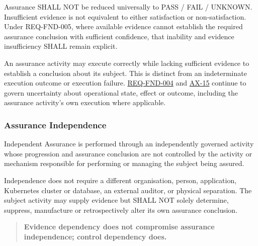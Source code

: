 Assurance SHALL NOT be reduced universally to PASS /\allowbreak{} FAIL /\allowbreak{} UNKNOWN. Insufficient evidence is not equivalent to either satisfaction or non-satisfaction. Under REQ-FND-005, where available evidence cannot establish the required assurance conclusion with sufficient confidence, that inability and evidence insufficiency SHALL remain explicit.

\label{rad:enabling:751}

An assurance activity may execute correctly while lacking sufficient evidence to establish a conclusion about its subject. This is distinct from an indeterminate execution outcome or execution failure. \href{https://github.com/fhirfactory/harmonia/blob/98410db60155198a75f74c79d98060070209faa1/docs/markdown/01-motivation/requirements-constraints/foundational-requirements.md\#req-fnd-004-explicit-indeterminate-outcome}{REQ-FND-004} and \href{https://github.com/fhirfactory/harmonia/blob/98410db60155198a75f74c79d98060070209faa1/docs/markdown/governance/architectural-axioms.md\#ax-15}{AX-15} continue to govern uncertainty about operational state, effect or outcome, including the assurance activity's own execution where applicable.

\label{rad:enabling:753}
\subsubsection*{Assurance Independence}
\label{rad:enabling:755}

Independent Assurance is performed through an independently governed activity whose progression and assurance conclusion are not controlled by the activity or mechanism responsible for performing or managing the subject being assured.

\label{rad:enabling:757}

Independence does not require a different organisation, person, application, Kubernetes cluster or database, an external auditor, or physical separation. The subject activity may supply evidence but SHALL NOT solely determine, suppress, manufacture or retrospectively alter its own assurance conclusion.

\label{rad:enabling:759}

\begin{quote}

\textbf{Evidence dependency does not compromise assurance independence; control dependency does.}


\end{quote}
\label{rad:enabling:761}

